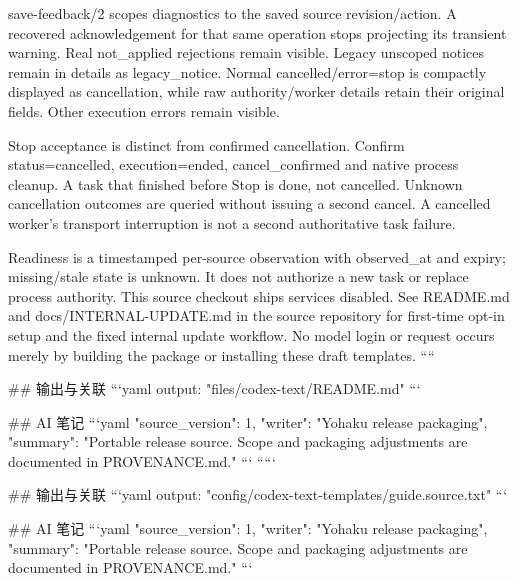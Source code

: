 save-feedback/2 scopes diagnostics to the saved source revision/action. A recovered acknowledgement for that same operation stops projecting its transient warning. Real not_applied rejections remain visible. Legacy unscoped notices remain in details as legacy_notice. Normal cancelled/error=stop is compactly displayed as cancellation, while raw authority/worker details retain their original fields. Other execution errors remain visible.

Stop acceptance is distinct from confirmed cancellation. Confirm status=cancelled, execution=ended, cancel_confirmed and native process cleanup. A task that finished before Stop is done, not cancelled. Unknown cancellation outcomes are queried without issuing a second cancel. A cancelled worker's transport interruption is not a second authoritative task failure.

Readiness is a timestamped per-source observation with observed_at and expiry; missing/stale state is unknown. It does not authorize a new task or replace process authority. This source checkout ships services disabled. See README.md and docs/INTERNAL-UPDATE.md in the source repository for first-time opt-in setup and the fixed internal update workflow. No model login or request occurs merely by building the package or installing these draft templates.
````

## 输出与关联
```yaml
output: "files/codex-text/README.md"
```

## AI 笔记
```yaml
{"source_version": 1, "writer": "Yohaku release packaging", "summary": "Portable release source. Scope and packaging adjustments are documented in PROVENANCE.md."}
```
`````

## 输出与关联
```yaml
output: "config/codex-text-templates/guide.source.txt"
```

## AI 笔记
```yaml
{"source_version": 1, "writer": "Yohaku release packaging", "summary": "Portable release source. Scope and packaging adjustments are documented in PROVENANCE.md."}
```
